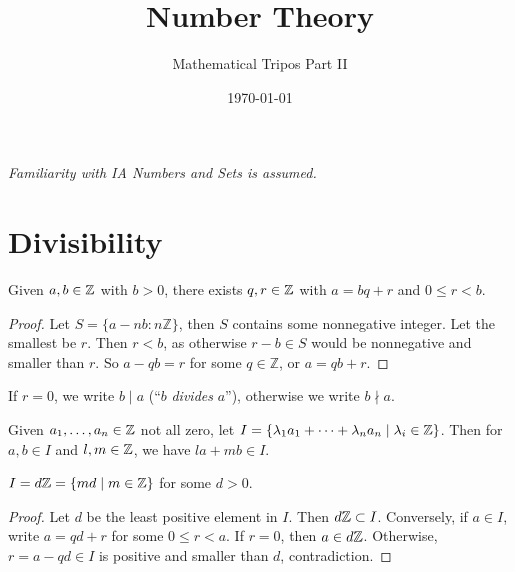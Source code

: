 \documentclass[a4paper, 10pt]{amsart}
\title{Number Theory}
\author{Mathematical Tripos Part II}
\date{\today}
\begin{document}
\maketitle



\begin{center}
\emph{Familiarity with IA Numbers and Sets is assumed.}
\end{center}

\section{Divisibility}



\begin{theorem}
    Given $a, b \in \mathbb{Z}$ with $b > 0$, there exists $q, r \in \mathbb{Z}$ with $a = bq + r$ and $0 \leq r < b$.
\end{theorem}
\begin{proof}
  Let $S=\{a-n b: n \mathbb{Z}\}$, then $S$ contains some nonnegative integer. Let the smallest be $r$. Then $r<b$, as otherwise $r-b \in S$ would be nonnegative and smaller than $r$. So $a-q b=r$ for some $q \in \mathbb{Z}$, or $a=q b+r$.
\end{proof}

\begin{definition}
  If $r = 0$, we write $b \mid a$ (``$b$ \emph{divides} $a$''), otherwise we write $b \nmid a$.
\end{definition}

Given $a_1, \dots, a_n \in \mathbb{Z}$ not all zero, let $I = \{\lambda_1 a_1 + \cdots + \lambda_n a_n \mid \lambda_i \in \mathbb{Z}\}$. Then for $a, b \in I$ and $l, m \in \mathbb{Z}$, we have $la + mb \in I$.

\begin{lemma}
  $I = d \mathbb{Z} = \{md \mid m \in \mathbb{Z}\}$ for some $d > 0$.
\end{lemma}
\begin{proof}
  Let $d$ be the least positive element in $I$. Then $d\mathbb{Z} \subset I$. Conversely, if $a \in I$, write $a = qd + r$ for some $0 \leq r < a$. If $r = 0$, then $a \in d \mathbb{Z}$. Otherwise, $r = a - qd \in I$ is positive and smaller than $d$, contradiction.
\end{proof}
\end{document}
